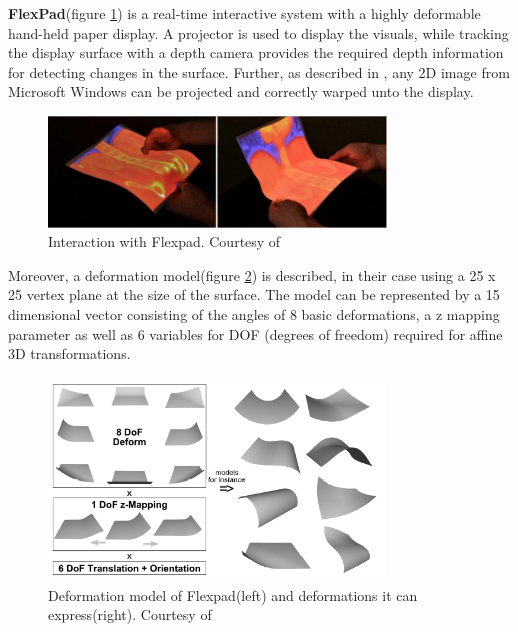 \documentclass[]{article}
\begin{document}
\textbf{FlexPad}(figure \ref{fig:flexpad}) is a real-time interactive system with a highly deformable hand-held paper display. A projector is used to display the visuals, while tracking the display surface with a depth camera provides the required depth information for detecting changes in the surface. Further, as described in \cite{steimle13}, any 2D image from Microsoft Windows can be projected and correctly warped unto the display. 


\begin{figure}[hbtp]
    \centering
    \includegraphics[width=0.8\textwidth]{figures/Flexpad.PNG}
    \caption{Interaction with Flexpad. Courtesy of \cite{steimle13}}
    \label{fig:flexpad}
\end{figure}

Moreover, a deformation model(figure \ref{fig:flexpad_deformation}) is described, in their case using a 25 x 25 vertex plane at the size of the surface. The model can be represented by a 15 dimensional vector consisting of the angles of 8 basic deformations, a z mapping parameter as well as 6 variables for DOF (degrees of freedom) required for affine 3D transformations. 

\begin{figure}[hbtp]
    \centering
    \includegraphics[width=0.8\textwidth]{figures/FlexpadDeformationModel.PNG}
    \caption{Deformation model of Flexpad(left) and deformations it can express(right). Courtesy of \cite{steimle13}}
    \label{fig:flexpad_deformation}
\end{figure}
\end{document}
